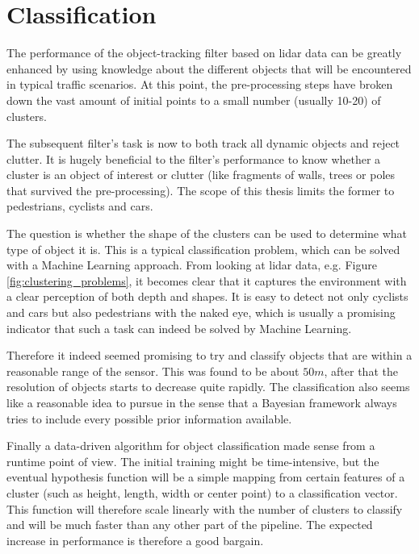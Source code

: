 
\section{Classification}

The performance of the object-tracking filter based on lidar data can be greatly enhanced by using knowledge about the different objects that will be encountered in typical traffic scenarios. At this point, the pre-processing steps have broken down the vast amount of initial points to a small number (usually 10-20) of clusters.

The subsequent filter's task is now to both track all dynamic objects and reject clutter. It is hugely beneficial to the filter's performance to know whether a cluster is an object of interest or clutter (like fragments of walls, trees or poles that survived the pre-processing). The scope of this thesis limits the former to pedestrians, cyclists and cars.

The question is whether the shape of the clusters can be used to determine what type of object it is. This is a typical classification problem, which can be solved with a Machine Learning approach. From looking at lidar data, e.g. Figure \ref{fig:clustering_problems}, it becomes clear that it captures the environment with a clear perception of both depth and shapes. It is easy to detect not only cyclists and cars but also pedestrians with the naked eye, which is usually a promising indicator that such a task can indeed be solved by Machine Learning. 

Therefore it indeed seemed promising to try and classify objects that are within a reasonable range of the sensor. This was found to be about $50m$, after that the resolution of objects starts to decrease quite rapidly. The classification also seems like a reasonable idea to pursue in the sense that a Bayesian framework always tries to include every possible prior information available. 

Finally a data-driven algorithm for object classification made sense from a runtime point of view. The initial training might be time-intensive, but the eventual hypothesis function will be a simple mapping from certain features of a cluster (such as height, length, width or center point) to a classification vector. This function will therefore scale linearly with the number of clusters to classify and will be much faster than any other part of the pipeline. The expected increase in performance is therefore a good bargain.

